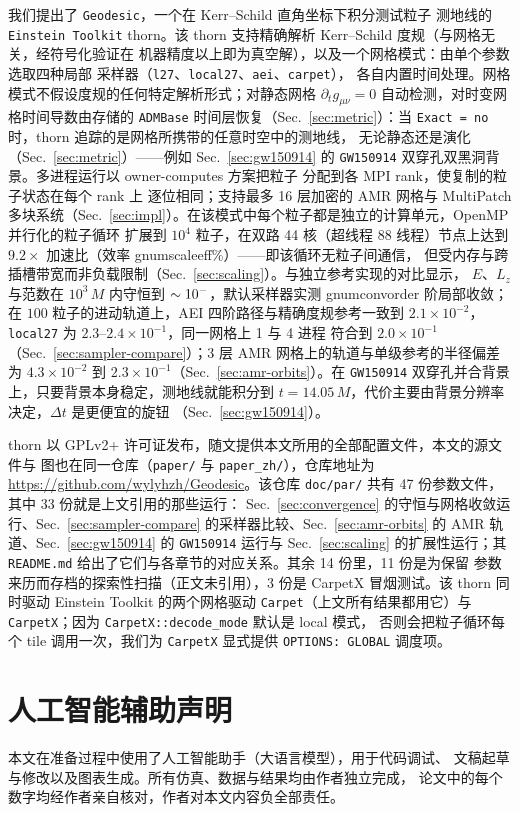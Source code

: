 \documentclass[11pt,UTF8]{ctexart}
\newcommand{\num}[1]{\csname gnum#1\endcsname}
\begin{document}
我们提出了 \texttt{Geodesic}，一个在 Kerr--Schild 直角坐标下积分测试粒子
测地线的 \texttt{Einstein Toolkit} thorn。该 thorn 支持精确解析 Kerr--Schild 度规（与网格无关，经符号化验证在
机器精度以上即为真空解），以及一个网格模式：由单个参数选取四种局部
采样器（\texttt{l27}、\texttt{local27}、\texttt{aei}、\texttt{carpet}），
各自内置时间处理。网格模式不假设度规的任何特定解析形式；对静态网格
$\partial_t g_{\mu\nu}=0$ 自动检测，对时变网格时间导数由存储的
\texttt{ADMBase} 时间层恢复（Sec.~\ref{sec:metric}）：当
\texttt{Exact = no} 时，thorn 追踪的是网格所携带的任意时空中的测地线，
无论静态还是演化（Sec.~\ref{sec:metric}）——例如
Sec.~\ref{sec:gw150914} 的 \texttt{GW150914} 双穿孔双黑洞背景。多进程运行以 owner-computes 方案把粒子
分配到各 MPI rank，使复制的粒子状态在每个 rank 上 逐位相同；支持最多 16 层加密的 AMR
网格与 MultiPatch 多块系统（Sec.~\ref{sec:impl}）。在该模式中每个粒子都是独立的计算单元，OpenMP 并行化的粒子循环
扩展到 $10^4$ 粒子，在双路 44 核（超线程 88 线程）节点上达到
$9.2\times$ 加速比（效率 \num{scaleeff}\%）——即该循环无粒子间通信，
但受内存与跨插槽带宽而非负载限制（Sec.~\ref{sec:scaling}）。与独立参考实现的对比显示，
$E$、$L_z$ 与范数在 $10^3\,M$ 内守恒到
$\sim 10^{-\num{consexp}}$，默认采样器实测 \num{convorder} 阶局部收敛；在
$100$ 粒子的进动轨道上，AEI 四阶路径与精确度规参考一致到 $2.1\times10^{-2}$，
\texttt{local27} 为 $2.3$--$2.4\times10^{-1}$，同一网格上 1 与 4 进程
符合到 $2.0\times10^{-1}$（Sec.~\ref{sec:sampler-compare}）；3 层 AMR
网格上的轨道与单级参考的半径偏差为
$4.3\times10^{-2}$ 到 $2.3\times10^{-1}$（Sec.~\ref{sec:amr-orbits}）。在
\texttt{GW150914} 双穿孔并合背景上，只要背景本身稳定，测地线就能积分到
$t=14.05\,M$，代价主要由背景分辨率决定，$\Delta t$ 是更便宜的旋钮
（Sec.~\ref{sec:gw150914}）。

thorn 以 GPLv2+ 许可证发布，随文提供本文所用的全部配置文件，本文的源文件与
图也在同一仓库（\texttt{paper/} 与 \texttt{paper\_zh/}），仓库地址为
\url{https://github.com/wylyhzh/Geodesic}。该仓库
\texttt{doc/par/} 共有 47 份参数文件，其中 33 份就是上文引用的那些运行：
Sec.~\ref{sec:convergence} 的守恒与网格收敛运行、Sec.~\ref{sec:sampler-compare}
的采样器比较、Sec.~\ref{sec:amr-orbits} 的 AMR 轨道、Sec.~\ref{sec:gw150914} 的
\texttt{GW150914} 运行与 Sec.~\ref{sec:scaling} 的扩展性运行；其
\texttt{README.md} 给出了它们与各章节的对应关系。其余 14 份里，11 份是为保留
参数来历而存档的探索性扫描（正文未引用），3 份是 CarpetX 冒烟测试。该 thorn 同时驱动
Einstein Toolkit 的两个网格驱动 \texttt{Carpet}（上文所有结果都用它）与
\texttt{CarpetX}；因为 \texttt{CarpetX::decode\_mode} 默认是 local 模式，
否则会把粒子循环每个 tile 调用一次，我们为 \texttt{CarpetX} 显式提供
\texttt{OPTIONS: GLOBAL} 调度项。

\section*{人工智能辅助声明}

本文在准备过程中使用了人工智能助手（大语言模型），用于代码调试、
文稿起草与修改以及图表生成。所有仿真、数据与结果均由作者独立完成，
论文中的每个数字均经作者亲自核对，作者对本文内容负全部责任。



\end{document}

